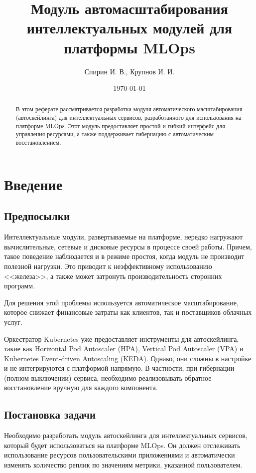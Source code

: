 \documentclass[a4paper]{article}
\title{Модуль автомасштабирования интеллектуальных модулей для платформы MLOps}
\author{Спирин И. В., Крупнов И. И.}
\date{\today}
\begin{document}
\maketitle
\begin{abstract}
  В этом реферате рассматривается разработка модуля автоматического
  масштабирования (автоскейлинга) для интеллектуальных сервисов,
  разработанного для использования на платформе MLOps. Этот модуль
  предоставляет простой и гибкий интерфейс для управления ресурсами,
  а также поддерживает гибернацию с автоматическим восстановлением.
\end{abstract}

\tableofcontents

\section{Введение}
\subsection{Предпосылки}

Интеллектуальные модули, развертываемые на платформе, нередко нагружают
вычислительные, сетевые и дисковые ресурсы в процессе своей работы.
Причем, такое поведение наблюдается и в режиме простоя, когда модуль
не производит полезной нагрузки. Это приводит к неэффективному использованию
<<железа>>, а также может затронуть производительность сторонних программ.

Для решения этой проблемы используется автоматическое
масштабирование, которое снижает финансовые затраты как клиентов, так и
поставщиков облачных услуг.

Оркестратор Kubernetes уже предоставляет инструменты для автоскейлинга,
такие как Horizontal Pod Autoscaler (HPA), Vertical Pod Autoscaler (VPA) и
Kubernetes Event-driven Autoscaling (KEDA). Однако, они сложны в
настройке и не интегрируются с платформой напрямую. В частности, при
гибернации (полном выключении) сервиса, необходимо реализовывать
обратное восстановление вручную для каждого компонента.

\subsection{Постановка задачи}

Необходимо разработать модуль автоскейлинга для интеллектуальных сервисов,
который будет использоваться на платформе MLOps. Он должен
отслеживать использование ресурсов пользовательскими приложениями и
автоматически изменять количество реплик по значениям метрики, указанной
пользователем.
\end{document}
